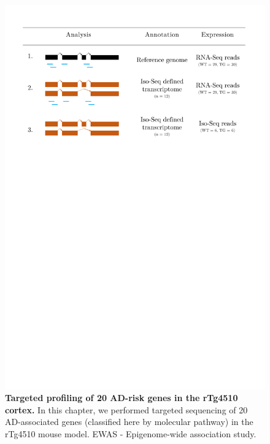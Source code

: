 \begin{figure}[htp]
	\centering
	\includegraphics[page=5,trim={1cm 32cm 1cm 0cm},clip,scale = 0.45]{Figures/Tg4510_diff_figures.pdf}
	\captionsetup{width=0.95\textwidth}
	\caption[Targeted profiling of 20 AD-risk genes in the rTg4510 cortex]%
	{\textbf{Targeted profiling of 20 AD-risk genes in the rTg4510 cortex.} In this chapter, we performed targeted sequencing of 20 AD-associated genes (classified here by molecular pathway) in the rTg4510 mouse model. EWAS - Epigenome-wide association study.}
	\label{fig:targeted_genes}
\end{figure}


